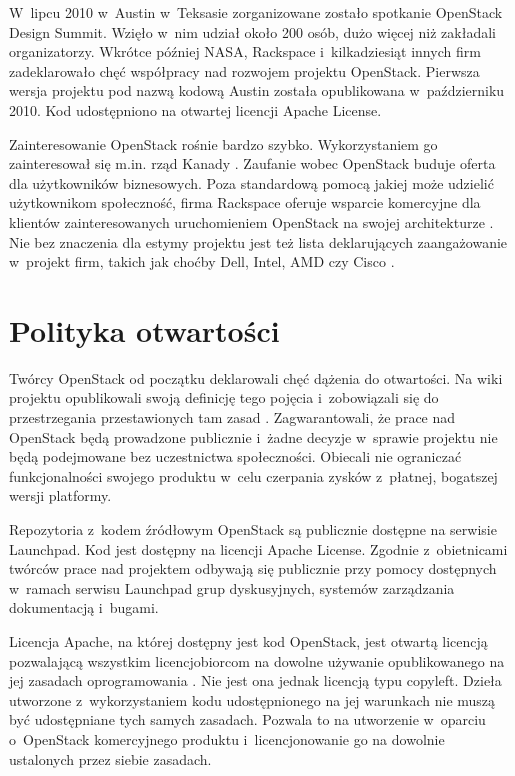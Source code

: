 	W~lipcu 2010 w~Austin w~Teksasie zorganizowane zostało spotkanie OpenStack
	Design Summit. Wzięło w~nim udział około 200 osób, dużo więcej niż
	zakładali organizatorzy. Wkrótce później NASA, Rackspace i~kilkadziesiąt
	innych firm zadeklarowało chęć współpracy nad rozwojem projektu OpenStack.
	Pierwsza wersja projektu pod nazwą kodową Austin została opublikowana
	w~październiku 2010. Kod udostępniono na otwartej licencji Apache License.

	Zainteresowanie OpenStack rośnie bardzo szybko. Wykorzystaniem go
	zainteresował się m.in. rząd Kanady \cite{computerworld_bort}. Zaufanie
	wobec OpenStack buduje oferta dla użytkowników biznesowych. Poza
	standardową pomocą jakiej może udzielić użytkownikom społeczność, firma
	Rackspace oferuje wsparcie komercyjne dla klientów zainteresowanych
	uruchomieniem OpenStack na swojej architekturze
	\cite{openstack_goes_commercial}. Nie bez znaczenia dla estymy projektu jest
	też lista deklarujących zaangażowanie w~projekt firm, takich jak choćby
	Dell, Intel, AMD czy Cisco \cite{openstack}.

	\section{Polityka otwartości}

	Twórcy OpenStack od początku deklarowali chęć dążenia do otwartości. Na wiki
	projektu opublikowali swoją definicję tego pojęcia i~zobowiązali się do
	przestrzegania przestawionych tam zasad \cite{openness}. Zagwarantowali, że
	prace nad OpenStack będą prowadzone publicznie i~żadne decyzje w~sprawie
	projektu nie będą podejmowane bez uczestnictwa społeczności. Obiecali
	nie ograniczać funkcjonalności swojego produktu w~celu czerpania zysków
	z~płatnej, bogatszej wersji platformy.

	Repozytoria z~kodem źródłowym OpenStack są publicznie dostępne na serwisie
	Launchpad. Kod jest dostępny na licencji Apache License. Zgodnie
	z~obietnicami twórców prace nad projektem odbywają się publicznie przy
	pomocy dostępnych w~ramach serwisu Launchpad grup dyskusyjnych, systemów
	zarządzania dokumentacją i~bugami.

	Licencja Apache, na której dostępny jest kod OpenStack, jest otwartą
	licencją pozwalającą wszystkim licencjobiorcom na dowolne używanie
	opublikowanego na jej zasadach oprogramowania \cite{apache_license_faq}. Nie
	jest ona jednak licencją typu copyleft. Dzieła utworzone z~wykorzystaniem
	kodu udostępnionego na jej warunkach nie muszą być udostępniane tych samych
	zasadach. Pozwala to na utworzenie w~oparciu o~OpenStack komercyjnego
	produktu i~licencjonowanie go na dowolnie ustalonych przez siebie zasadach.

